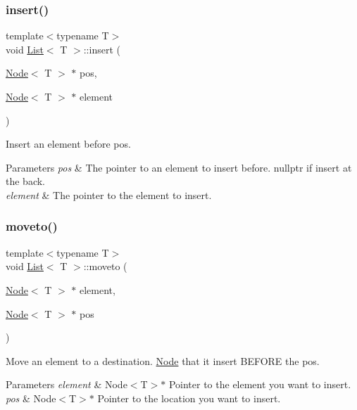 \subsubsection{\texorpdfstring{insert()}{insert()}\hspace{0.1cm}{\footnotesize\ttfamily [2/2]}}
{\footnotesize\ttfamily template$<$typename T$>$ \\
void \hyperlink{class_list}{List}$<$ T $>$\+::insert (\begin{DoxyParamCaption}\item[{\hyperlink{struct_node}{Node}$<$ T $>$ $\ast$}]{pos,  }\item[{\hyperlink{struct_node}{Node}$<$ T $>$ $\ast$}]{element }\end{DoxyParamCaption})\hspace{0.3cm}{\ttfamily [inline]}}



Insert an element before pos. 


\begin{DoxyParams}{Parameters}
{\em pos} & The pointer to an element to insert before. nullptr if insert at the back. \\
\hline
{\em element} & The pointer to the element to insert. \\
\hline
\end{DoxyParams}
\mbox{\label{class_list_a5bfb723e873c6af1e03b085a24ad62f4}} 
\subsubsection{\texorpdfstring{moveto()}{moveto()}}
{\footnotesize\ttfamily template$<$typename T$>$ \\
void \hyperlink{class_list}{List}$<$ T $>$\+::moveto (\begin{DoxyParamCaption}\item[{\hyperlink{struct_node}{Node}$<$ T $>$ $\ast$}]{element,  }\item[{\hyperlink{struct_node}{Node}$<$ T $>$ $\ast$}]{pos }\end{DoxyParamCaption})\hspace{0.3cm}{\ttfamily [inline]}}



Move an element to a destination. \hyperlink{struct_node}{Node} that it insert B\+E\+F\+O\+RE the pos. 


\begin{DoxyParams}{Parameters}
{\em element} & Node$<$\+T$>$$\ast$ Pointer to the element you want to insert. \\
\hline
{\em pos} & Node$<$\+T$>$$\ast$ Pointer to the location you want to insert.\\
\hline
\end{DoxyParams}

